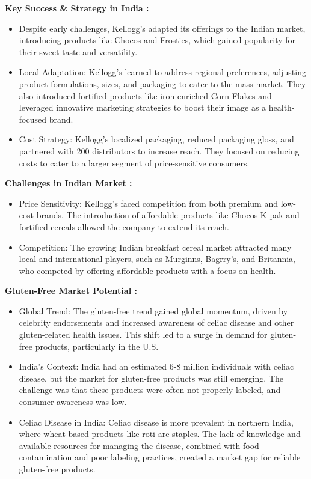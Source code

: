 \documentclass[10pt,a4paper]{book}
\begin{document}
\textbf{Key Success \& Strategy in India :} 
\begin{itemize}
    \item Despite early challenges, Kellogg's adapted its offerings to the Indian market, introducing products like Chocos and Frosties, which gained popularity for their sweet taste and versatility. 
    \item Local Adaptation: Kellogg’s learned to address regional preferences, adjusting product formulations, sizes, and packaging to cater to the mass market. They also introduced fortified products like iron-enriched Corn Flakes and leveraged innovative marketing strategies to boost their image as a health-focused brand.

    \item Cost Strategy: Kellogg's localized packaging, reduced packaging gloss, and partnered with 200 distributors to increase reach. They focused on reducing costs to cater to a larger segment of price-sensitive consumers.
\end{itemize}

\textbf{Challenges in Indian Market :} 
\begin{itemize}
    \item Price Sensitivity: Kellogg's faced competition from both premium and low-cost brands. The introduction of affordable products like Chocos K-pak and fortified cereals allowed the company to extend its reach.

    \item Competition: The growing Indian breakfast cereal market attracted many local and international players, such as Murginns, Bagrry’s, and Britannia, who competed by offering affordable products with a focus on health.
\end{itemize}

\textbf{Gluten-Free Market Potential :}
\begin{itemize}
    \item Global Trend: The gluten-free trend gained global momentum, driven by celebrity endorsements and increased awareness of celiac disease and other gluten-related health issues. This shift led to a surge in demand for gluten-free products, particularly in the U.S.

    \item India's Context: India had an estimated 6-8 million individuals with celiac disease, but the market for gluten-free products was still emerging. The challenge was that these products were often not properly labeled, and consumer awareness was low.

    \item Celiac Disease in India: Celiac disease is more prevalent in northern India, where wheat-based products like roti are staples. The lack of knowledge and available resources for managing the disease, combined with food contamination and poor labeling practices, created a market gap for reliable gluten-free products.
\end{itemize}
\end{document}
